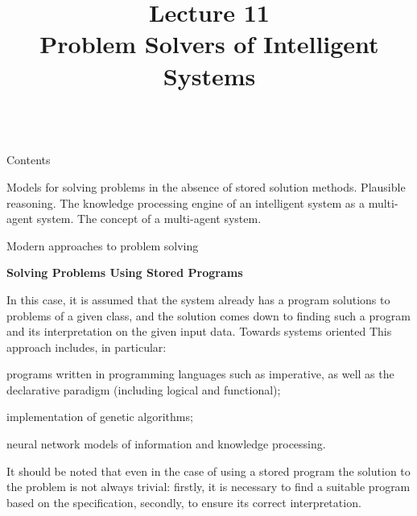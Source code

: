 \title{Lecture 11\\Problem Solvers of Intelligent Systems \vspace{-2em}}

\begin{frame}
	\titlepage
\end{frame}

\begin{frame}{\\Contents}
	\topline
	\justifying
	
	Models for solving problems in the absence of stored solution methods. Plausible reasoning. The knowledge processing engine of an intelligent system as a multi-agent system. The concept of a multi-agent system.
	
\end{frame}

\begin{frame}{Modern approaches to problem solving}
	\topline
	\justifying
	\vspace*{\fill}
	
	\footnotesize
	
	\vspace{2mm}
	\textbf{Solving Problems Using Stored Programs}
	
	\vspace{1mm}
	In this case, it is assumed that the system already has a program
	solutions to problems of a given class, and the solution comes down to finding such a program
	and its interpretation on the given input data. Towards systems oriented
	This approach includes, in particular:
	\begin{textitemize}
		\item programs written in programming languages such as imperative,
		as well as the declarative paradigm (including logical and functional);
		\item implementation of genetic algorithms;
		\item neural network models of information and knowledge processing.
	\end{textitemize}
	
	\vspace{1mm}
	It should be noted that even in the case of using a stored program the solution to the problem is not always trivial: firstly, it is necessary to find a suitable program based on the specification, secondly, to ensure its
	correct interpretation.
	
\end{frame}

